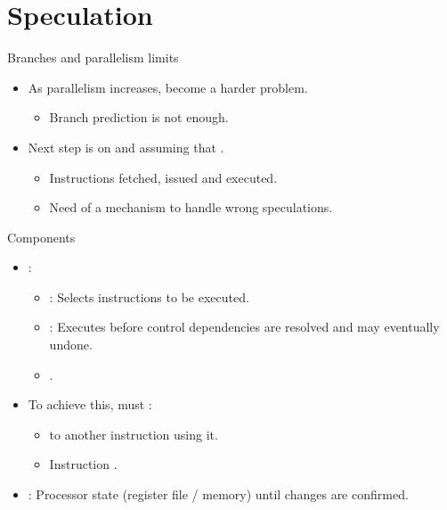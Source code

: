 \section{Speculation}

\begin{frame}[t]{Branches and parallelism limits}
\begin{itemize}
  \item As parallelism increases,  become a harder problem.
    \begin{itemize}
      \item Branch prediction is not enough.
    \end{itemize}

  \item Next step is  on 
         and  
        assuming that .
    \begin{itemize}
      \item Instructions fetched, issued and executed.
      \item Need of a mechanism to handle wrong speculations.
    \end{itemize}
\end{itemize}
\end{frame}

\begin{frame}[t]{Components}
\begin{itemize}
  \item {}:
    \begin{itemize}
      \item {}: 
            Selects instructions to be executed.
      \item {}: 
            Executes before control dependencies are resolved and may eventually undone.
      \item {}.
    \end{itemize}

  \item To achieve this, must :
    \begin{itemize}
      \item {} to another instruction using it.
      \item Instruction .
    \end{itemize}

  \item {}:
        Processor state (register file / memory)  until changes are confirmed.
\end{itemize}
\end{frame}

